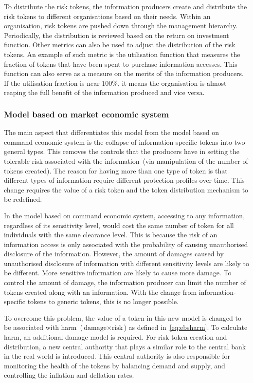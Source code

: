 To distribute the risk tokens, the information producers create and
distribute the risk tokens to different organisations based on their
needs. Within an organisation, risk tokens are pushed down through the
management hierarchy. Periodically, the distribution is reviewed based
on the return on investment function. Other metrics can also be used
to adjust the distribution of the risk tokens. An example of such
metric is the utilisation function that measures the fraction of
tokens that have been spent to purchase information accesses. This
function can also serve as a measure on the merits of the information
producers. If the utilisation fraction is near $100\%$, it means the
organisation is almost reaping the full benefit of the information
produced and vice versa.

\subsubsection{Model based on market economic system}
\label{sec:ebsmarketeconomysystem}
The main aspect that differentiates this model from the model based on
command economic system is the collapse of information specific tokens
into two general types. This removes the controls that the producers
have in setting the tolerable risk associated with the
information~(via manipulation of the number of tokens created). The
reason for having more than one type of token is that different types
of information require different protection profiles over time. This
change requires the value of a risk token and the token distribution
mechanism to be redefined.

In the model based on command economic system, accessing to any
information, regardless of its sensitivity level, would cost the same
number of token for all individuals with the same clearance
level. This is because the risk of an information access is only
associated with the probability of causing unauthorised disclosure of
the information. However, the amount of damages caused by unauthorised
disclosure of information with different sensitivity levels are likely
to be different. More sensitive information are likely to cause more
damage. To control the amount of damage, the information producer can
limit the number of tokens created along with an information. With the
change from information-specific tokens to generic tokens, this is no
longer possible.

To overcome this problem, the value of a token in this new model is
changed to be associated with harm~($\text{damage} \times
\text{risk}$) as defined in~\eqref{eq:ebsharm}. To calculate harm, an
additional damage model is required. For risk token creation and
distribution, a new central authority that plays a similar role to the
central bank in the real world is introduced. This central authority
is also responsible for monitoring the health of the tokens by
balancing demand and supply, and controlling the inflation and
deflation rates.

